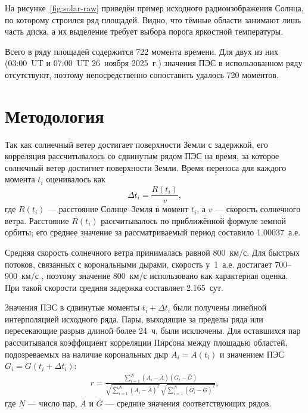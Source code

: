 \documentclass{article}
\begin{document}
На рисунке~\ref{fig:solar-raw} приведён пример исходного радиоизображения
Солнца, по которому строился ряд площадей. Видно, что тёмные области
занимают лишь часть диска, а их выделение требует выбора порога яркостной
температуры.


Всего в ряду площадей содержится 722 момента времени. Для двух из них
(03:00~UT и 07:00~UT 26~ноября 2025~г.) значения ПЭС в использованном ряду
отсутствуют, поэтому непосредственно сопоставить удалось 720 моментов.

\section{Методология}

Так как солнечный ветер достигает поверхности Земли с задержкой, его корреляция
рассчитывалось со сдвинутым рядом ПЭС на время, за которое солнечный ветер
достигнет поверхности Земли. Время переноса для каждого момента $t_i$
оценивалось как
\begin{equation}
\Delta t_i = \frac{R(t_i)}{v},
\label{eq:delay}
\end{equation}
где $R(t_i)$ --- расстояние Солнце--Земля в момент $t_i$, а $v$ --- скорость
солнечного ветра. Расстояние $R(t_i)$ рассчитывалось по приближённой формуле
земной орбиты; его среднее значение за рассматриваемый период составило
1.00037~а.е.

Средняя скорость солнечного ветра принималась равной 800~км/с. Для быстрых
потоков, связанных с корональными дырами, скорость у~1~а.е. достигает
700--900~км/с \citep{cranmer2019properties}, поэтому значение 800~км/с
использовано как характерная оценка. При такой скорости средняя задержка
составляет 2.165~сут.

Значения ПЭС в сдвинутые моменты $t_i+\Delta t_i$ были получены линейной
интерполяцией исходного ряда. Пары, выходящие за пределы ряда или
пересекающие разрыв длиной более 24~ч, были исключены. Для оставшихся пар
рассчитывался коэффициент корреляции Пирсона между площадью областей, подозреваемых на наличие
корональных дыр
$A_i=A(t_i)$ и значением ПЭС $G_i=G(t_i+\Delta t_i)$:
\begin{equation}
\begin{aligned}
r = \frac{\sum_{i=1}^{N}(A_i-\bar{A})(G_i-\bar{G})}
{\sqrt{\sum_{i=1}^{N}(A_i-\bar{A})^2}\,
 \sqrt{\sum_{i=1}^{N}(G_i-\bar{G})^2}},
\end{aligned}
\label{eq:pearson}
\end{equation}
где $N$ --- число пар, $\bar{A}$ и $\bar{G}$ --- средние значения
соответствующих рядов.
\end{document}
